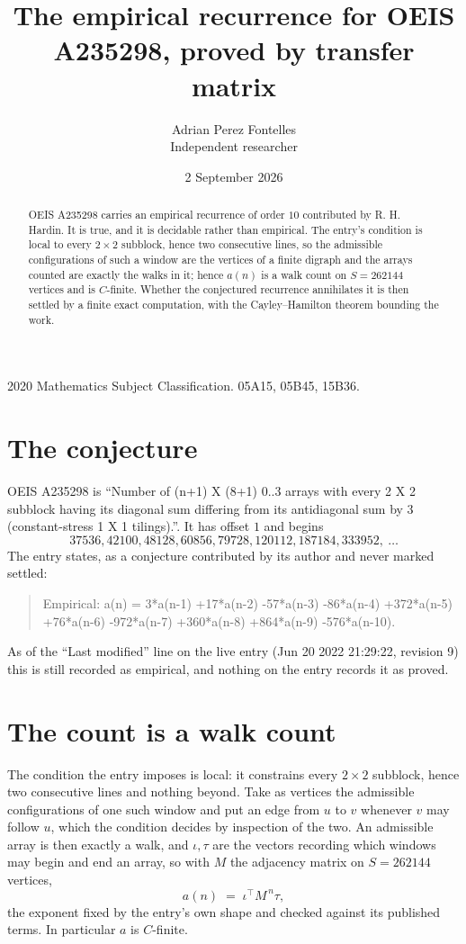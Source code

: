 \documentclass[11pt,a4paper]{article}
\title{The empirical recurrence for OEIS A235298, proved by transfer matrix}
\author{Adrian Perez Fontelles\\ \small Independent researcher}
\date{2 September 2026}
\theoremstyle{plain}
\theoremstyle{definition}
\begin{document}
\maketitle

\begin{abstract}
OEIS A235298 carries an empirical recurrence of order $10$ contributed by R. H. Hardin. It is
true, and it is decidable rather than empirical. The entry's condition is local to every $2\times2$ subblock, hence two consecutive lines, so
the admissible configurations of such a window are the vertices of a finite digraph and the
arrays counted are exactly the walks in it; hence $a(n)$ is a walk count on $S=262144$ vertices
and is $C$-finite. Whether the conjectured recurrence annihilates it is then settled by a
finite exact computation, with the Cayley--Hamilton theorem bounding the work.
\end{abstract}

\noindent\small 2020 Mathematics Subject Classification. 05A15, 05B45, 15B36.\normalsize

\section{The conjecture}

OEIS A235298 is ``Number of (n+1) X (8+1) 0..3 arrays with every 2 X 2 subblock having its diagonal sum differing from its antidiagonal sum by 3 (constant-stress 1 X 1 tilings).''. It has offset $1$ and begins
\[
37536, 42100, 48128, 60856, 79728, 120112, 187184, 333952,\ \dots
\]
The entry states, as a conjecture contributed by its author and never marked settled:
\begin{quote}
Empirical: a(n) = 3*a(n-1) +17*a(n-2) -57*a(n-3) -86*a(n-4) +372*a(n-5) +76*a(n-6) -972*a(n-7) +360*a(n-8) +864*a(n-9) -576*a(n-10).
\end{quote}
As of the ``Last modified'' line on the live entry (Jun 20 2022 21:29:22, revision 9) this is still
recorded as empirical, and nothing on the entry records it as proved.

\section{The count is a walk count}

The condition the entry imposes is local: it constrains every $2\times2$ subblock, hence two consecutive lines and nothing beyond. Take as vertices the admissible configurations of one such window and put an edge from $u$ to $v$ whenever $v$ may follow $u$, which the condition decides by inspection of the two.
An admissible array is then exactly a walk, and $\iota,\tau$ are the vectors recording which windows may begin and end an array, so with $M$ the adjacency matrix on $S=262144$ vertices,
\[
a(n)\;=\;\iota^{\!\top}M^{\,n}\tau ,
\]
the exponent fixed by the entry's own shape and checked against its published terms. In
particular $a$ is $C$-finite.
\end{document}
